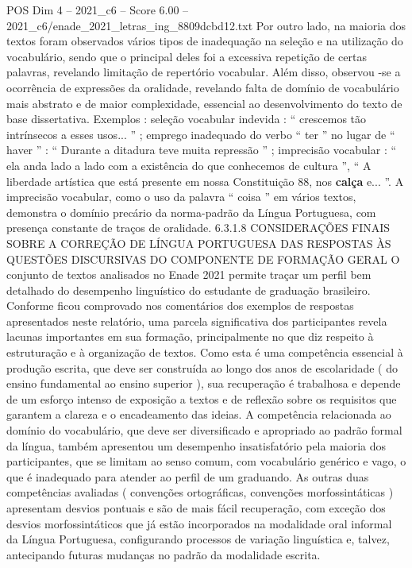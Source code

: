 \begin{textsample}{POS Dim 4 – 2021\_c6 – Score 6.00 – 2021\_c6/enade\_2021\_letras\_ing\_8809dcbd12.txt}
Por outro lado, na maioria dos textos foram observados vários tipos de inadequação na seleção e na utilização do vocabulário, sendo que o principal deles foi a excessiva repetição de certas palavras, revelando limitação de repertório vocabular.
Além disso, observou -se a ocorrência de expressões da oralidade, revelando falta de domínio de vocabulário mais abstrato e de maior complexidade, essencial ao desenvolvimento do texto de base dissertativa.
Exemplos : seleção vocabular indevida : “ crescemos tão intrínsecos a esses usos... ” ; emprego inadequado do verbo “ ter ” no lugar de “ haver ” : “ Durante a ditadura teve muita repressão ” ; imprecisão vocabular : “ ela anda lado a lado com a existência do que conhecemos de cultura ”, “ A liberdade artística que está presente em nossa Constituição 88, nos \textbf{calça} e... ”.
A imprecisão vocabular, como o uso da palavra “ coisa ” em vários textos, demonstra o domínio precário da norma-padrão da Língua Portuguesa, com presença constante de traços de oralidade. 6.3.1.8 CONSIDERAÇÕES FINAIS SOBRE A CORREÇÃO DE LÍNGUA PORTUGUESA DAS RESPOSTAS ÀS QUESTÕES DISCURSIVAS DO COMPONENTE DE FORMAÇÃO GERAL O conjunto de textos analisados no Enade 2021 permite traçar um perfil bem detalhado do desempenho linguístico do estudante de graduação brasileiro.
Conforme ficou comprovado nos comentários dos exemplos de respostas apresentados neste relatório, uma parcela significativa dos participantes revela lacunas importantes em sua formação, principalmente no que diz respeito à estruturação e à organização de textos.
Como esta é uma competência essencial à produção escrita, que deve ser construída ao longo dos anos de escolaridade ( do ensino fundamental ao ensino superior ), sua recuperação é trabalhosa e depende de um esforço intenso de exposição a textos e de reflexão sobre os requisitos que garantem a clareza e o encadeamento das ideias.
A competência relacionada ao domínio do vocabulário, que deve ser diversificado e apropriado ao padrão formal da língua, também apresentou um desempenho insatisfatório pela maioria dos participantes, que se limitam ao senso comum, com vocabulário genérico e vago, o que é inadequado para atender ao perfil de um graduando.
As outras duas competências avaliadas ( convenções ortográficas, convenções morfossintáticas ) apresentam desvios pontuais e são de mais fácil recuperação, com exceção dos desvios morfossintáticos que já estão incorporados na modalidade oral informal da Língua Portuguesa, configurando processos de variação linguística e, talvez, antecipando futuras mudanças no padrão da modalidade escrita.

\end{textsample}
